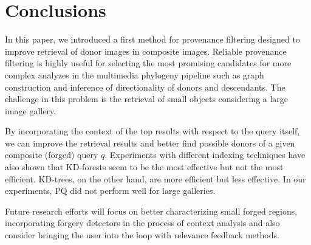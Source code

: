 \section{Conclusions}
\label{sec:conclusions}
In this paper, we introduced a first method for provenance filtering designed to improve retrieval of donor images in composite images. Reliable provenance filtering is highly useful for selecting the most promising candidates for more complex analyzes in the multimedia phylogeny pipeline such as graph construction and inference of directionality of donors and descendants. 
The challenge in this problem is the retrieval of small objects considering a large image gallery.

By incorporating the context of the top results with respect to the query itself, we can improve the retrieval results and better find possible donors of a given composite (forged) query $q$. Experiments with different indexing techniques have also shown that KD-forests seem to be the most effective but not the most efficient. KD-trees, on the other hand, are more efficient but less effective. In our experiments, PQ did not perform well for large galleries.

Future research efforts will focus on better characterizing small forged regions, incorporating forgery detectors in the process of context analysis and also consider bringing the user into the loop with relevance feedback methods. 
